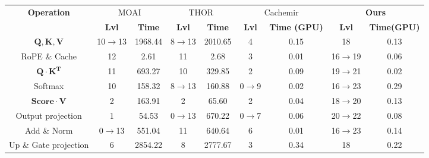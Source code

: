 \begin{table}[t]
\label{tab:main_exp}
  \footnotesize
  \begin{threeparttable}
    \begin{tabular}{c|cccccccc}
    \toprule
    \multirow{2}{*}{\textbf{Operation}}&
    \multicolumn{2}{c}{MOAI\cite{zhang2025moai}} &
    \multicolumn{2}{c}{THOR\cite{moon2024thor}} &
    \multicolumn{2}{c}{Cachemir} &
    \multicolumn{2}{c}{\textbf{Ours}} \\
    &\textbf{Lvl} & \textbf{Time} & \textbf{Lvl} & \textbf{Time} & \textbf{Lvl} & \textbf{Time (GPU)} & \textbf{Lvl} & \textbf{Time(GPU)} \\
    \midrule
    $\mathbf{Q},\mathbf{K},\mathbf{V}$ & 10$\rightarrow$13 & 1968.44 & 8$\rightarrow$13 & 2010.65 & 4 & 0.15 & 18 & 0.13 \\
    RoPE \& Cache & 12 & 2.61 & 11 & 2.68 & 3 & 0.01 & 16$\rightarrow$19 & 0.06 \\
    $\mathbf{Q}\cdot\mathbf{K^T}$ & 11 & 693.27 & 10 & 329.85 & 2 & 0.09 & 19$\rightarrow$21 & 0.02 \\
    Softmax & 10 & 158.32 & 8$\rightarrow$13 & 160.88 & 0$\rightarrow$9 & 0.02 & 16$\rightarrow$23 & 0.29 \\
    $\mathbf{Score}\cdot\mathbf{V}$ & 2 & 163.91 & 2 & 65.60 & 2 & 0.04 & 18$\rightarrow$20 & 0.13 \\
    Output projection & 1 & 54.53 & 0$\rightarrow$13 & 670.22 & 0$\rightarrow$7 & 0.06 & 20$\rightarrow$22 & 0.08 \\
    Add \& Norm & 0$\rightarrow$13 & 551.04 & 11 & 640.64 & 6 & 0.01 & 16$\rightarrow$23 & 0.14 \\
    Up \& Gate projection & 6 & 2854.22 & 8 & 2777.67 & 3 & 0.34 & 18 & 0.22 \\

\end{tabular}
\end{threeparttable}
\end{table}
